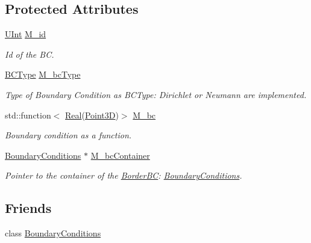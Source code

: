 \subsection*{Protected Attributes}
\begin{DoxyCompactItemize}
\item 
\hyperlink{namespaceFVCode3D_a4bf7e328c75d0fd504050d040ebe9eda}{U\+Int} \hyperlink{classFVCode3D_1_1BoundaryConditions_1_1BorderBC_aa4986bb3130dc4081573343d4e82f8a5}{M\+\_\+id}
\begin{DoxyCompactList}\small\item\em Id of the BC. \end{DoxyCompactList}\item 
\hyperlink{namespaceFVCode3D_a73660061f11f1671164ce171a053f8c5}{B\+C\+Type} \hyperlink{classFVCode3D_1_1BoundaryConditions_1_1BorderBC_a2023b092c3f51b2ea04c14e544a0da6b}{M\+\_\+bc\+Type}
\begin{DoxyCompactList}\small\item\em Type of Boundary Condition as B\+C\+Type\+: Dirichlet or Neumann are implemented. \end{DoxyCompactList}\item 
std\+::function$<$ \hyperlink{namespaceFVCode3D_a40c1f5588a248569d80aa5f867080e83}{Real}(\hyperlink{classFVCode3D_1_1Point3D}{Point3D})$>$ \hyperlink{classFVCode3D_1_1BoundaryConditions_1_1BorderBC_a9594b3bde8e7eb818ed4a726dbdc9e0c}{M\+\_\+bc}
\begin{DoxyCompactList}\small\item\em Boundary condition as a function. \end{DoxyCompactList}\item 
\hyperlink{classFVCode3D_1_1BoundaryConditions}{Boundary\+Conditions} $\ast$ \hyperlink{classFVCode3D_1_1BoundaryConditions_1_1BorderBC_ac2e5dff7f5d8966e20e3146d1fb924ca}{M\+\_\+bc\+Container}
\begin{DoxyCompactList}\small\item\em Pointer to the container of the \hyperlink{classFVCode3D_1_1BoundaryConditions_1_1BorderBC}{Border\+BC}\+: \hyperlink{classFVCode3D_1_1BoundaryConditions}{Boundary\+Conditions}. \end{DoxyCompactList}\end{DoxyCompactItemize}
\subsection*{Friends}
\begin{DoxyCompactItemize}
\item 
class \hyperlink{classFVCode3D_1_1BoundaryConditions_1_1BorderBC_ab29e2d671f43f82e5c10546c576d8a60}{Boundary\+Conditions}
\end{DoxyCompactItemize}


